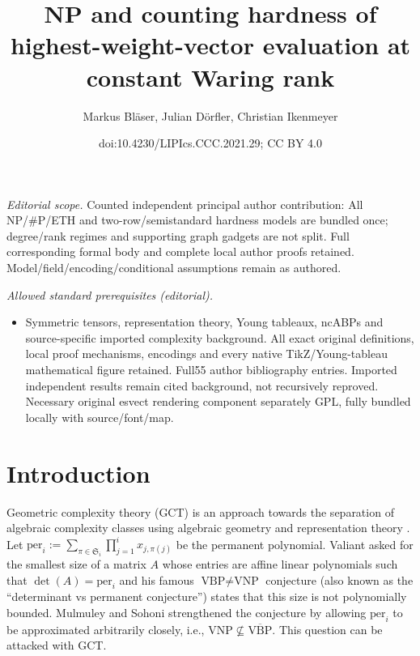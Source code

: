 \documentclass[10pt,a4paper]{article}
\title{NP and counting hardness of highest-weight-vector evaluation at constant Waring rank}
\author{Markus Bläser, Julian Dörfler, Christian Ikenmeyer}
\date{doi:10.4230/LIPIcs.CCC.2021.29; CC BY 4.0}
\numberwithin{equation}{section}
\theoremstyle{definition}
\newcommand{\aS}{\mathfrak{S}}
\newcommand{\per}{\text{per}}
\begin{document}
\maketitle
\noindent\textit{Editorial scope.} Counted independent principal author contribution: All NP/\#P/ETH and two-row/semistandard hardness models are bundled once; degree/rank regimes and supporting graph gadgets are not split. Full corresponding formal body and complete local author proofs retained. Model/field/encoding/conditional assumptions remain as authored.\par\medskip
\noindent\textit{Allowed standard prerequisites (editorial).}\begin{itemize}
\item Symmetric tensors, representation theory, Young tableaux, ncABPs and source-specific imported complexity background. All exact original definitions, local proof mechanisms, encodings and every native TikZ/Young-tableau mathematical figure retained. Full55 author bibliography entries. Imported independent results remain cited background, not recursively reproved. Necessary original esvect rendering component separately GPL, fully bundled locally with source/font/map.
\end{itemize}\medskip
\section{Introduction}
\label{sec:intro}
Geometric complexity theory (GCT) is an approach towards the separation of algebraic complexity classes using algebraic geometry and representation theory \cite{gct1, gct2, BLMW:11}.
Let $\per_i := \sum_{\pi\in\aS_i} \prod_{j=1}^i x_{j,\pi(j)}$ be the permanent polynomial. Valiant 
asked for the smallest size of a matrix $A$ whose entries are affine linear polynomials such that $\det(A)=\per_i$ and his famous $\text{VBP}\neq\text{VNP}$ conjecture (also known as the ``determinant vs permanent conjecture'') states that this size is not polynomially bounded.
%
%
%
Mulmuley and Sohoni strengthened the conjecture by allowing $\per_i$ to be approximated arbitrarily closely, i.e., $\text{VNP}\not\subseteq\overline{\text{VBP}}$.
This question can be attacked with GCT.
\end{document}
